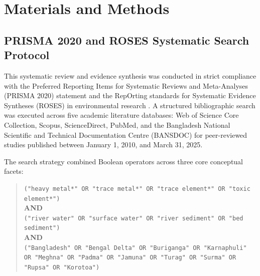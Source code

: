 \documentclass[authoryear,preprint,12pt]{elsarticle}
\begin{document}
\section{Materials and Methods}

\subsection{PRISMA 2020 and ROSES Systematic Search Protocol}
This systematic review and evidence synthesis was conducted in strict compliance with the Preferred Reporting Items for Systematic Reviews and Meta-Analyses (PRISMA 2020) statement \citep{Page2021} and the RepOrting standards for Systematic Evidence Syntheses (ROSES) in environmental research \citep{Haddaway2018ROSES,CEE2018}. A structured bibliographic search was executed across five academic literature databases: Web of Science Core Collection, Scopus, ScienceDirect, PubMed, and the Bangladesh National Scientific and Technical Documentation Centre (BANSDOC) for peer-reviewed studies published between January 1, 2010, and March 31, 2025.

The search strategy combined Boolean operators across three core conceptual facets:
\begin{quote}\small\raggedright
\texttt{("heavy metal*" OR "trace metal*" OR "trace element*" OR "toxic element*")} \\
\textbf{AND} \\
\texttt{("river water" OR "surface water" OR "river sediment" OR "bed sediment")} \\
\textbf{AND} \\
\texttt{("Bangladesh" OR "Bengal Delta" OR "Buriganga" OR "Karnaphuli" OR "Meghna" OR "Padma" OR "Jamuna" OR "Turag" OR "Surma" OR "Rupsa" OR "Korotoa")}
\end{quote}
\end{document}
